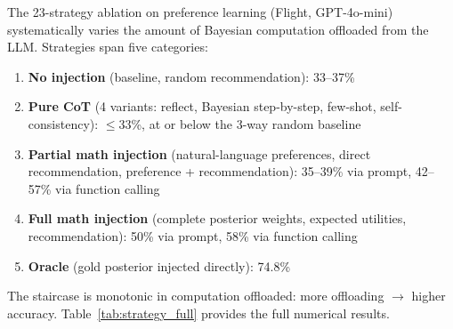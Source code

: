\documentclass{article}
\begin{document}
The 23-strategy ablation on preference learning (Flight, GPT-4o-mini) systematically varies the amount of Bayesian computation offloaded from the LLM. Strategies span five categories:

\begin{enumerate}
    \item \textbf{No injection} (baseline, random recommendation): 33--37\%
    \item \textbf{Pure CoT} (4 variants: reflect, Bayesian step-by-step, few-shot, self-consistency): $\leq$33\%, at or below the 3-way random baseline
    \item \textbf{Partial math injection} (natural-language preferences, direct recommendation, preference + recommendation): 35--39\% via prompt, 42--57\% via function calling
    \item \textbf{Full math injection} (complete posterior weights, expected utilities, recommendation): 50\% via prompt, 58\% via function calling
    \item \textbf{Oracle} (gold posterior injected directly): 74.8\%
\end{enumerate}

The staircase is monotonic in computation offloaded: more offloading $\to$ higher accuracy. Table~\ref{tab:strategy_full} provides the full numerical results.
\end{document}
